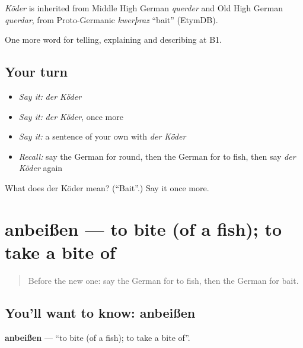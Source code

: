\begin{cousinweb}
\emph{Köder} is inherited from Middle High German \emph{querder} and Old High German \emph{querdar}, from Proto-Germanic \emph{kwerþraz} \textquotedblleft{}bait\textquotedblright{} (EtymDB).
\end{cousinweb}

\begin{grammarlens}[title={What you've built}]
One more word for telling, explaining and describing at B1.
\end{grammarlens}

\subsection*{Your turn}
\begin{itemize}
\raggedright
  \item \emph{Say it:} \emph{der Köder}
  \item \emph{Say it:} \emph{der Köder}, once more
  \item \emph{Say it:} a sentence of your own with \emph{der Köder}
  \item \emph{Recall:} say the German for round, then the German for to fish, then say \emph{der Köder} again
\end{itemize}

\begin{tcolorbox}[breakable,colback=teal!4,colframe=teal!35!black,title={Before you move on}]
What does der Köder mean? (\textquotedblleft{}Bait\textquotedblright{}.) Say it once more.
\end{tcolorbox}
\section[anbeißen]{anbeißen — to bite (of a fish); to take a bite of}

\label{lesson:GE-C502-anbeissen}



\begin{quote}
Before the new one: say the German for to fish, then the German for bait.
\end{quote}

\subsection*{You'll want to know: anbeißen}
\textbf{anbeißen} — \textquotedblleft{}to bite (of a fish); to take a bite of\textquotedblright{}.

